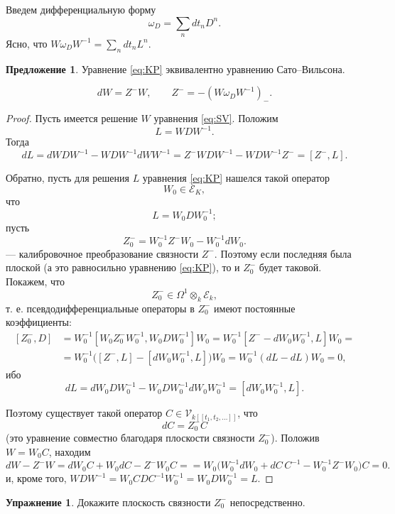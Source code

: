 \documentclass{article}
\theoremstyle{definition}
\theoremstyle{definition} %
\theoremstyle{remark}     %
\theoremstyle{definition}
\theoremstyle{definition}
\theoremstyle{definition}
\theoremstyle{definition}
\theoremstyle{definition}
\newtheorem{proposition}[theorem]{Предложение}
\theoremstyle{definition}
\theoremstyle{definition}
\theoremstyle{definition}
\newtheorem{exercise}{Упражнение}[section]
\begin{document}
Введем дифференциальную форму
\[
  \omega_D = \sum_n dt_n D^n.
\]
Ясно, что \( W\omega_D W^{-1} = \sum_n dt_n L^n \).

\begin{proposition}
    Уравнение \ref{eq:KP} эквивалентно уравнению Сато–Вильсона.
    
    \begin{equation*}\label{eq:SV}
    dW = Z^- W, \qquad Z^- = -(W \omega_D W^{-1})_-. \tag{СВ}
    \end{equation*}
\end{proposition}

\begin{proof}
  Пусть имеется решение \(W\) уравнения \ref{eq:SV}. Положим 
  \[
    L = WDW^{-1}.
  \]
  Тогда 
  \[
    dL = dWDW^{-1} - WDW^{-1}dWW^{-1} = Z^{-}WDW^{-1} - WDW^{-1}Z^{-} = [Z^{-}, L].
  \]

  Обратно, пусть для решения \(L\) уравнения \ref{eq:KP} нашелся такой оператор 
  \[
    W_0 \in \mathcal{E}_K,
  \]
  что 
  \[
    L = W_0DW_0^{-1};
  \]
  пусть 
  \[
    Z_0^{-} = W_0^{-1}Z^{-}W_0 - W_0^{-1}dW_0.
  \]
  — калибровочное преобразование связности \(Z^{-}\). Поэтому если последняя была плоской (а это равносильно уравнению \ref{eq:KP}), то и \(Z_0^{-}\) будет таковой. Покажем, что 
  \[
    Z_0^{-} \in \Omega^1 \otimes_k \mathcal{E}_k,
  \]
  т. е. псевдодифференциальные операторы в \(Z_0^{-}\) имеют постоянные коэффициенты:
  \[
    \begin{aligned}
      [Z_0^{-}, D] &= W_0^{-1}[W_0Z_0^{-}W_0^{-1}, W_0DW_0^{-1}]W_0 
                    = W_0^{-1}[Z^{-} - dW_0W_0^{-1}, L]W_0 = \\
                  &= W_0^{-1}\bigl([Z^{-}, L] - [dW_0W_0^{-1}, L]\bigr)W_0 
                    = W_0^{-1}(dL - dL)W_0 = 0,
    \end{aligned}
  \]
  ибо 
  \[
    dL = dW_0DW_0^{-1} - W_0DW_0^{-1}dW_0W_0^{-1} = [dW_0W_0^{-1}, L].
  \]

  Поэтому существует такой оператор \(C \in \mathcal{V}_{k[[t_1, t_2, \dots]]}\), что 
  \[
    dC = Z_0^{-}C
  \]
  (это уравнение совместно благодаря плоскости связности \(Z_0^{-}\)). Положив \(W = W_0C\), находим 
  \[
    dW - Z^{-}W = dW_0C + W_0dC - Z^{-}W_0C = 
    = W_0\bigl(W_0^{-1}dW_0 + dC\,C^{-1} - W_0^{-1}Z^{-}W_0\bigr)C = 0.
  \]
и, кроме того, \( WDW^{-1} = W_0CDC^{-1}W_0^{-1} = W_0DW_0^{-1} = L \).

\end{proof}

\begin{exercise}
  Докажите плоскость связности \( Z_0^- \) непосредственно.
\end{exercise}
\end{document}
